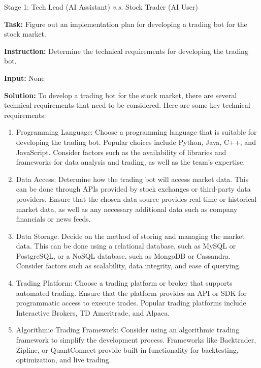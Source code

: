 \begin{AIBoxBreak}{Stage 1: Tech Lead (AI Assistant) \textit{v.s.} Stock Trader (AI User)}

\textbf{Task:} Figure out an implementation plan for developing a trading bot for the stock market.

\usermsg

\textbf{Instruction:} Determine the technical requirements for developing the trading bot.

\textbf{Input:} None


\assistantmsg

\textbf{Solution:} To develop a trading bot for the stock market, there are several technical requirements that need to be considered. Here are some key technical requirements:

\begin{enumerate}

\item   Programming Language: Choose a programming language that is suitable for developing the trading bot. Popular choices include Python, Java, C++, and JavaScript. Consider factors such as the availability of libraries and frameworks for data analysis and trading, as well as the team’s expertise.

\item  Data Access: Determine how the trading bot will access market data. This can be done through APIs provided by stock exchanges or third-party data providers. Ensure that the chosen data source provides real-time or historical market data, as well as any necessary additional data such as company financials or news feeds.

\item  Data Storage: Decide on the method of storing and managing the market data. This can be done using a relational database, such as MySQL or PostgreSQL, or a NoSQL database, such as MongoDB or Cassandra. Consider factors such as scalability, data integrity, and ease of querying.

\item  Trading Platform: Choose a trading platform or broker that supports automated trading. Ensure that the platform provides an API or SDK for programmatic access to execute trades. Popular trading platforms include Interactive Brokers, TD Ameritrade, and Alpaca.

\item  Algorithmic Trading Framework: Consider using an algorithmic trading framework to simplify the development process. Frameworks like Backtrader, Zipline, or QuantConnect provide built-in functionality for backtesting, optimization, and live trading.


\end{enumerate}
\end{AIBoxBreak}
